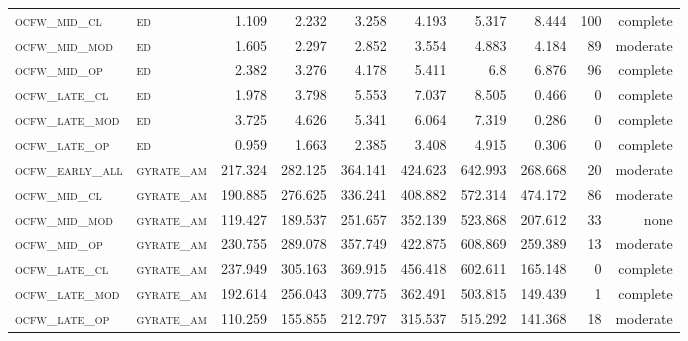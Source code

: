 \begin{landscape}
\begin{center}
\begin{footnotesize}
\begin{longtable}{llrrrrr|rrr}
\textsc{ocfw\_mid\_cl   } & \textsc{ed        }    & 1.109    & 2.232    & 3.258    & 4.193    & 5.317      & 8.444         & 100           & complete             \\
\textsc{ocfw\_mid\_mod  } & \textsc{ed        }    & 1.605    & 2.297    & 2.852    & 3.554    & 4.883      & 4.184         & 89            & moderate        \\
\textsc{ocfw\_mid\_op   } & \textsc{ed        }    & 2.382    & 3.276    & 4.178    & 5.411    & 6.8        & 6.876         & 96            & complete        \\
\textsc{ocfw\_late\_cl  } & \textsc{ed        }    & 1.978    & 3.798    & 5.553    & 7.037    & 8.505      & 0.466         & 0             & complete            \\
\textsc{ocfw\_late\_mod } & \textsc{ed        }    & 3.725    & 4.626    & 5.341    & 6.064    & 7.319      & 0.286         & 0             & complete            \\
\textsc{ocfw\_late\_op  } & \textsc{ed        }    & 0.959    & 1.663    & 2.385    & 3.408    & 4.915      & 0.306         & 0             & complete            \\
\textsc{ocfw\_early\_all} & \textsc{gyrate\_am}    & 217.324  & 282.125  & 364.141  & 424.623  & 642.993    & 268.668       & 20            & moderate        \\
\textsc{ocfw\_mid\_cl   } & \textsc{gyrate\_am}    & 190.885  & 276.625  & 336.241  & 408.882  & 572.314    & 474.172       & 86            & moderate        \\
\textsc{ocfw\_mid\_mod  } & \textsc{gyrate\_am}    & 119.427  & 189.537  & 251.657  & 352.139  & 523.868    & 207.612       & 33            & none        \\
\textsc{ocfw\_mid\_op   } & \textsc{gyrate\_am}    & 230.755  & 289.078  & 357.749  & 422.875  & 608.869    & 259.389       & 13            & moderate        \\
\textsc{ocfw\_late\_cl  } & \textsc{gyrate\_am}    & 237.949  & 305.163  & 369.915  & 456.418  & 602.611    & 165.148       & 0             & complete            \\
\textsc{ocfw\_late\_mod } & \textsc{gyrate\_am}    & 192.614  & 256.043  & 309.775  & 362.491  & 503.815    & 149.439       & 1             & complete        \\
\textsc{ocfw\_late\_op  } & \textsc{gyrate\_am}    & 110.259  & 155.855  & 212.797  & 315.537  & 515.292    & 141.368       & 18            & moderate        \\

\end{longtable}
\end{footnotesize}
\end{center}
\end{landscape}
